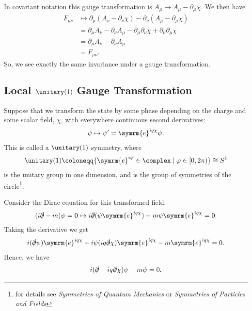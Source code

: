 \documentclass[fleqn]{NotesClass}
\newcommand{\course}[1]{\textit{#1}}
\newcommand{\e}{\symrm{e}}
\begin{document}
    In covariant notation this gauge transformation is \(A_\mu \mapsto A_\mu - \partial_\mu \chi\).
    We then have
    \begin{align}
        F_{\mu\nu} &\mapsto \partial_\mu(A_\nu - \partial_\nu \chi) - \partial_\nu(A_\mu - \partial_\mu \chi)\\
        &= \partial_\mu A_\nu - \partial_\nu A_\mu - \partial_\mu \partial_\nu \chi + \partial_\nu \partial_\mu \chi\\
        &= \partial_\mu A_\nu - \partial_\nu A_\mu\\
        &= F_{\mu\nu}.
    \end{align}
    So, we see exactly the same invariance under a gauge transformation.
    
    \subsection{Local \texorpdfstring{\(\unitary(1)\)}{U(1)} Gauge Transformation}
    Suppose that we transform the state by some phase depending on the charge and some scalar field, \(\chi\), with everywhere continuous second derivatives:
    \begin{equation}
        \psi \mapsto \psi' = \e^{iq\chi}\psi.
    \end{equation}
    This is called a \(\unitary(1)\) symmetry, where
    \begin{equation}
        \unitary(1) \coloneqq \{\e^{i\varphi} \in \complex \mid \varphi \in [0, 2\pi)\} \cong S^1
    \end{equation}
    is the unitary group in one dimension, and is the group of symmetries of the circle\footnote{for details see \course{Symmetries of Quantum Mechanics} or \course{Symmetries of Particles and Fields}}.
    
    Consider the Dirac equation for this transformed field:
    \begin{equation}
        (i\slashed{\partial} - m)\psi = 0 \mapsto i\slashed{\partial}(\psi\e^{iq\chi}) - m\psi\e^{iq\chi} = 0.
    \end{equation}
    Taking the derivative we get
    \begin{equation}
        i(\slashed{\partial}\psi)\e^{iq\chi} + i\psi(iq\slashed{\partial}\chi)\e^{iq\chi} - m\e^{iq\chi} = 0.
    \end{equation}
    Hence, we have
    \begin{equation}
        i(\slashed{\partial} + iq\slashed{\partial}\chi)\psi - m\psi = 0.
    \end{equation}
    
\end{document}
